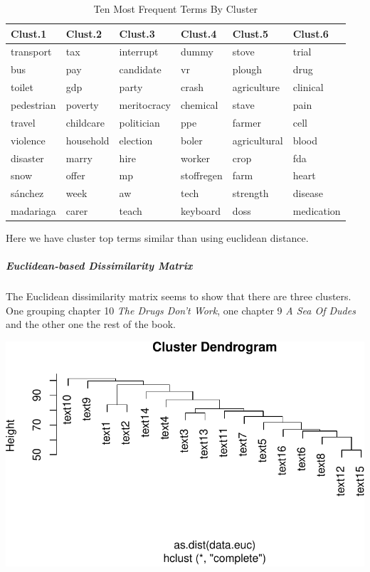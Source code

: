 \documentclass[
]{article}
\begin{document}
\begin{table}

\caption{\label{tab:cosine cutree}Ten Most Frequent Terms By Cluster}
\centering
\begin{tabular}[t]{l|l|l|l|l|l}
\hline
Clust.1 & Clust.2 & Clust.3 & Clust.4 & Clust.5 & Clust.6\\
\hline
transport & tax & interrupt & dummy & stove & trial\\
\hline
bus & pay & candidate & vr & plough & drug\\
\hline
toilet & gdp & party & crash & agriculture & clinical\\
\hline
pedestrian & poverty & meritocracy & chemical & stave & pain\\
\hline
travel & childcare & politician & ppe & farmer & cell\\
\hline
violence & household & election & boler & agricultural & blood\\
\hline
disaster & marry & hire & worker & crop & fda\\
\hline
snow & offer & mp & stoffregen & farm & heart\\
\hline
sánchez & week & aw & tech & strength & disease\\
\hline
madariaga & carer & teach & keyboard & doss & medication\\
\hline
\end{tabular}
\end{table}

Here we have cluster top terms similar than using euclidean distance.

\hypertarget{euclidean-based-dissimilarity-matrix}{%
\subparagraph{Euclidean-based Dissimilarity
Matrix}\label{euclidean-based-dissimilarity-matrix}}

The Euclidean dissimilarity matrix seems to show that there are three
clusters. One grouping chapter 10 \emph{The Drugs Don't Work}, one
chapter 9 \emph{A Sea Of Dudes} and the other one the rest of the book.

\begin{center}\includegraphics[width=0.7\linewidth]{report_files/figure-latex/Euclidean-based-1} \end{center}
\end{document}
